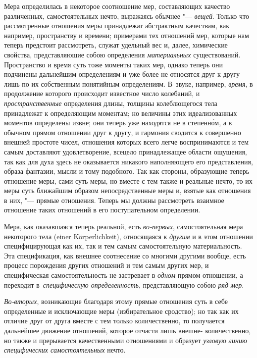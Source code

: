 Мера определилась в некоторое соотношение мер, составляющих качество
различенных, самостоятельных нечто, выражаясь обычнее "--- {\em вещей}.
Только что рассмотренные отношения меры принадлежат абстрактным качествам, как
например, пространству и времени; примерами тех отношений мер, которые нам
теперь предстоит рассмотреть, служат удельный вес и, далее, химические
свойства, представляющие собою определения {\em материальных} существований.
Пространство и время суть тоже моменты таких мер, однако теперь они подчинены
дальнейшим определениям и уже более не относятся друг к другу лишь по их
собственным понятийным определениям. В~звуке, например, {\em время},
в продолжение которого происходит известное число колебаний,
и {\em пространственные} определения длины, толщины колеблющегося тела
принадлежат к определяющим моментам; но величины этих идеализованных моментов
определены извне; они теперь уже находятся не в степенн\'{о}м, а в обычном
прямом отношении друг к другу, и гармония сводится к совершенно внешней
простоте чисел, отношения которых всего легче воспринимаются и тем самым
доставляют удовлетворение, всецело принадлежащее области ощущения, так как для
духа здесь не оказывается никакого наполняющего его представления, образа
фантазии, мысли и тому подобного. Так как стороны, образующие теперь отношение
меры, сами суть меры, но вместе с тем также и реальные нечто, то их меры суть
ближайшим образом непосредственные меры и, взятые как отношения в них, "---
прямые отношения. Теперь мы должны рассмотреть взаимное отношение таких
отношений в его поступательном определении.

Мера, как оказавшаяся теперь реальной, есть {\em во-первых}, самостоятельная
мера некоторого тела (einer Körper\-lich\-keit), относящаяся к {\em другим} и в
этом отношении специфицирующая как их, так и тем самым самостоятельную
материальность. Эта спецификация, как внешнее соотнесение со многими другими
вообще, есть процесс порождения других отношений и тем самым других мер, и
специфическая самостоятельность не застревает в {\em одном} прямом отношении,
а переходит в~{\em специфическую определенность}, представляющую собою
{\em ряд мер}.

{\em Во-вторых}, возникающие благодаря этому прямые отношения суть в себе
определенные и исключающие меры (избирательное сродство); но так как их отличие
друг от друга вместе с тем только количественно, то получается дальнейшее
движение отношений, которое отчасти лишь внешне- количественно, но также
и прерывается качественными отношениями и образует {\em узловую линию
специфических самостоятельных} нечто.

